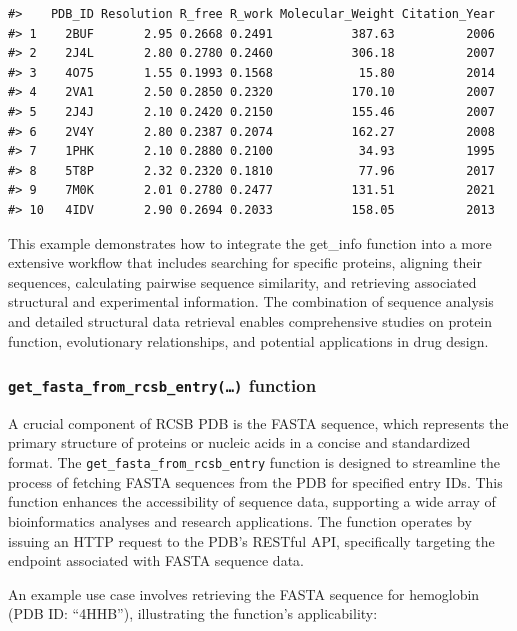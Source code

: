 \begin{verbatim}
#>    PDB_ID Resolution R_free R_work Molecular_Weight Citation_Year
#> 1    2BUF       2.95 0.2668 0.2491           387.63          2006
#> 2    2J4L       2.80 0.2780 0.2460           306.18          2007
#> 3    4O75       1.55 0.1993 0.1568            15.80          2014
#> 4    2VA1       2.50 0.2850 0.2320           170.10          2007
#> 5    2J4J       2.10 0.2420 0.2150           155.46          2007
#> 6    2V4Y       2.80 0.2387 0.2074           162.27          2008
#> 7    1PHK       2.10 0.2880 0.2100            34.93          1995
#> 8    5T8P       2.32 0.2320 0.1810            77.96          2017
#> 9    7M0K       2.01 0.2780 0.2477           131.51          2021
#> 10   4IDV       2.90 0.2694 0.2033           158.05          2013
\end{verbatim}

This example demonstrates how to integrate the get\_info function into a more extensive workflow that includes searching for specific proteins, aligning their sequences, calculating pairwise sequence similarity, and retrieving associated structural and experimental information. The combination of sequence analysis and detailed structural data retrieval enables comprehensive studies on protein function, evolutionary relationships, and potential applications in drug design.

\subsubsection{\texorpdfstring{\texttt{get\_fasta\_from\_rcsb\_entry(…)} function}{get\_fasta\_from\_rcsb\_entry(\ldots) function}}\label{get_fasta_from_rcsb_entry-function}

A crucial component of RCSB PDB is the FASTA sequence, which represents the primary structure of proteins or nucleic acids in a concise and standardized format. The \texttt{get\_fasta\_from\_rcsb\_entry} function is designed to streamline the process of fetching FASTA sequences from the PDB for specified entry IDs. This function enhances the accessibility of sequence data, supporting a wide array of bioinformatics analyses and research applications. The function operates by issuing an HTTP request to the PDB's RESTful API, specifically targeting the endpoint associated with FASTA sequence data.

An example use case involves retrieving the FASTA sequence for hemoglobin (PDB ID: ``4HHB''), illustrating the function's applicability:

